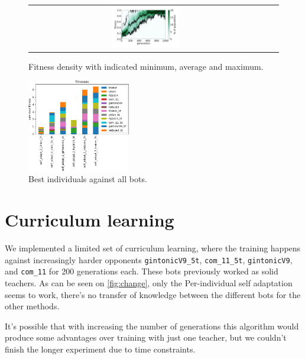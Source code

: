 \documentclass[11pt,a4paper]{scrartcl}
\begin{document}
\begin{figure}[H]
\begin{tabular}{ccc}
\includegraphics[width=0.3\textwidth]{img/self_adapt_2_trainer_5t.png}
\end{tabular}
\caption{Fitness density with indicated minimum, average and maximum.}
\label{fig:self_adapt_2_5t}
\end{figure}

\begin{figure}[H]
\center
\includegraphics[width=0.4\textwidth]{img/self_adapt_2_5t.png}
\caption{Best individuals against all bots.}
\label{fig:self_adapt_2_5t_aa}
\end{figure}

\section{Curriculum learning}

We implemented a limited set of curriculum learning, where the training happens against increasingly harder opponents \texttt{gintonicV9\_5t}, \texttt{com\_11\_5t}, \texttt{gintonicV9}, and \texttt{com\_11} for 200 generations each. These bots previously worked as solid teachers. As can be seen on \ref{fig:change}, only the Per-individual self adaptation seems to work, there's no transfer of knowledge between the different bots for the other methods.

It's possible that with increasing the number of generations this algorithm would produce some advantages over training with just one teacher, but we couldn't finish the longer experiment due to time constraints.
\end{document}
